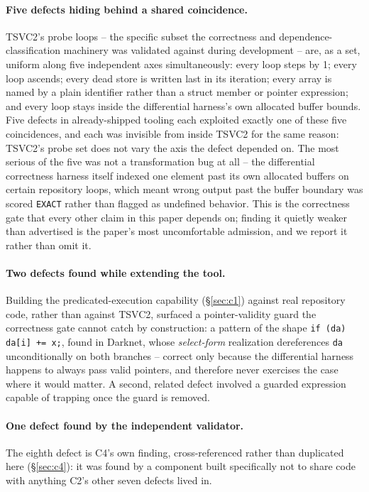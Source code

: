 \documentclass[sigconf,review,anonymous]{acmart}
\begin{document}
\paragraph{Five defects hiding behind a shared coincidence.} TSVC2's probe
loops -- the specific subset the correctness and dependence-classification
machinery was validated against during development -- are, as a set,
uniform along five independent axes simultaneously: every loop steps by 1;
every loop ascends; every dead store is written last in its iteration; every
array is named by a plain identifier rather than a struct member or pointer
expression; and every loop stays inside the differential harness's own
allocated buffer bounds. Five defects in already-shipped tooling each
exploited exactly one of these five coincidences, and each was invisible
from inside TSVC2 for the same reason: TSVC2's probe set does not vary the
axis the defect depended on. The most serious of the five was not a
transformation bug at all -- the differential correctness harness itself
indexed one element past its own allocated buffers on certain repository
loops, which meant wrong output past the buffer boundary was scored
\texttt{EXACT} rather than flagged as undefined behavior. This is the
correctness gate that every other claim in this paper depends on; finding it
quietly weaker than advertised is the paper's most uncomfortable admission,
and we report it rather than omit it.

\paragraph{Two defects found while extending the tool.} Building the
predicated-execution capability (\S\ref{sec:c1}) against real repository
code, rather than against TSVC2, surfaced a pointer-validity guard the
correctness gate cannot catch by construction: a pattern of the shape
\texttt{if (da) da[i] += x;}, found in Darknet, whose \emph{select-form}
realization dereferences \texttt{da} unconditionally on both branches --
correct only because the differential harness happens to always pass valid
pointers, and therefore never exercises the case where it would matter. A
second, related defect involved a guarded expression capable of trapping
once the guard is removed.

\paragraph{One defect found by the independent validator.} The eighth
defect is C4's own finding, cross-referenced rather than duplicated here
(\S\ref{sec:c4}): it was found by a component built specifically not to
share code with anything C2's other seven defects lived in.
\end{document}
